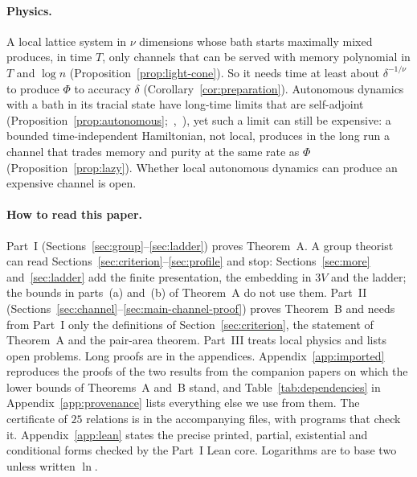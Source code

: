 \paragraph{Physics.} A local lattice system in $\nu$ dimensions whose bath starts maximally mixed produces, in time $T$, only channels that can
be served with memory polynomial in $T$ and $\log n$ (Proposition~\ref{prop:light-cone}). So it needs time at least about $\delta^{-1/\nu}$ to
produce $\Phi$ to accuracy $\delta$ (Corollary~\ref{cor:preparation}). Autonomous dynamics with a bath in its tracial state have long-time
limits that are self-adjoint (Proposition~\ref{prop:autonomous};~\cite[Remark~10.3]{JungeLeMerdyXu2006},~\cite[Remark~5.2]{HaagerupMusat2011}), yet such a limit can still be
expensive: a bounded time-independent Hamiltonian, not local, produces in the long run a channel that trades memory and purity at the same
rate as $\Phi$ (Proposition~\ref{prop:lazy}). Whether local autonomous dynamics can produce an expensive channel is open.

\paragraph{How to read this paper.} Part~I (Sections~\ref{sec:group}--\ref{sec:ladder}) proves Theorem~A. A group theorist can read
Sections~\ref{sec:criterion}--\ref{sec:profile} and stop: Sections~\ref{sec:more} and~\ref{sec:ladder} add the finite presentation, the
embedding in $3V$ and the ladder; the bounds in parts~(a) and~(b) of Theorem~A do not use them. Part~II (Sections~\ref{sec:channel}--\ref{sec:main-channel-proof})
proves Theorem~B and needs from Part~I only the definitions of Section~\ref{sec:criterion}, the statement of Theorem~A and the pair-area
theorem. Part~III treats local physics and lists open problems. Long proofs are in the appendices. Appendix~\ref{app:imported} reproduces the proofs of the two results from the companion papers on which
the lower bounds of Theorems~A and~B stand, and Table~\ref{tab:dependencies} in Appendix~\ref{app:provenance} lists everything else we use from them. The
certificate of $25$ relations is in the accompanying files, with programs that check it. Appendix~\ref{app:lean} states the precise printed, partial, existential and conditional forms checked by the Part~I Lean core. Logarithms are to base two unless written $\ln$.
